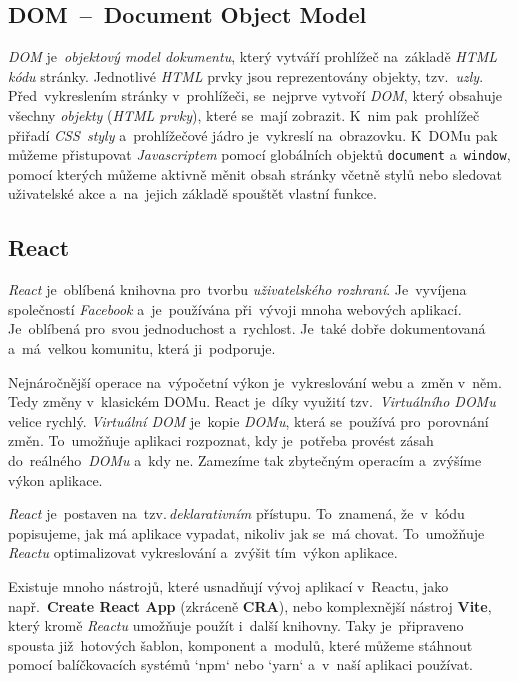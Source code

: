 \documentclass[10pt,a4paper]{article}
\begin{document}
        \subsection{DOM~--~Document Object Model}
            \emph{DOM} je~\emph{objektový model dokumentu}, který vytváří prohlížeč na~základě \emph{HTML kódu} stránky. Jednotlivé \emph{HTML} prvky jsou reprezentovány objekty, tzv.~\emph{uzly}. Před~vykreslením stránky v~prohlížeči, se~nejprve vytvoří \emph{DOM}, který obsahuje všechny \emph{objekty} (\emph{HTML prvky}), které se~mají zobrazit. K~nim pak~prohlížeč přiřadí \emph{CSS~styly} a~prohlížečové jádro je~vykreslí na~obrazovku. K~DOMu pak můžeme přistupovat \emph{Javascriptem} pomocí globálních objektů \texttt{document} a~\texttt{window}, pomocí kterých můžeme aktivně měnit obsah stránky včetně stylů nebo sledovat uživatelské akce a~na~jejich základě spouštět vlastní funkce.\cite[2.1.01]{kantor_javascript}
        
        \subsection{React}
            \emph{React} je~oblíbená knihovna pro~tvorbu \emph{uživatelského rozhraní}. Je~vyvíjena společností \emph{Facebook} a~je~používána při~vývoji mnoha webových aplikací. Je~oblíbená pro~svou jednoduchost a~rychlost. Je~také dobře dokumentovaná a~má~velkou komunitu, která ji~podporuje.
            
            Nejnáročnější operace na~výpočetní výkon je~vykreslování webu a~změn v~něm. Tedy změny v~klasickém DOMu. React je~díky využití tzv.~\emph{Virtuálního DOMu} velice rychlý. \emph{Virtuální DOM} je~kopie \emph{DOMu}, která se~používá pro~porovnání změn. To~umožňuje aplikaci rozpoznat, kdy je~potřeba provést zásah do~reálného~\emph{DOMu} a~kdy ne. Zamezíme tak zbytečným operacím a~zvýšíme výkon aplikace. \cite{elrom2021react}
            
            \emph{React} je~postaven na~tzv.\,\emph{deklarativním} přístupu. To~znamená, že~v~kódu popisujeme, jak má aplikace vypadat, nikoliv jak se~má chovat. To~umožňuje \emph{Reactu} optimalizovat vykreslování a~zvýšit tím~výkon aplikace.
            
            Existuje mnoho nástrojů, které usnadňují vývoj aplikací v~Reactu, jako např.~\textbf{Create React App} (zkráceně \textbf{CRA}), nebo komplexnější nástroj \textbf{Vite}, který kromě \emph{Reactu} umožňuje použít i~další knihovny. Taky je~připraveno spousta již~hotových šablon, komponent a~modulů, které můžeme stáhnout pomocí balíčkovacích systémů `npm` nebo `yarn` a~v~naší aplikaci používat.
\end{document}
